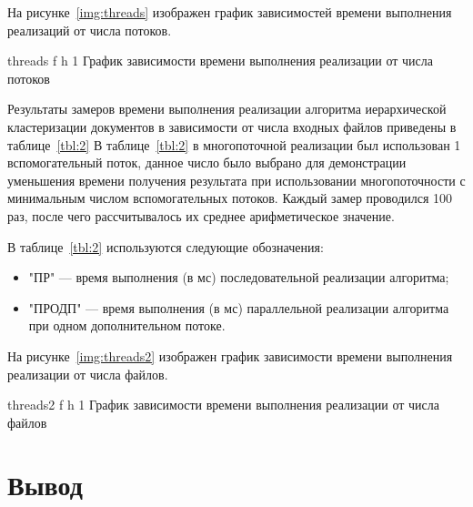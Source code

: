 На рисунке~\ref{img:threads} изображен график зависимостей времени выполнения реализаций от числа потоков.

{threads} %
{f} %
{h} %
{1\textwidth} %
{График зависимости времени выполнения реализации от числа потоков} %

Результаты замеров времени выполнения реализации алгоритма иерархической кластеризации документов в зависимости от числа входных файлов приведены в таблице~\ref{tbl:2} В таблице~\ref{tbl:2} в многопоточной реализации был использован 1 вспомогательный поток, данное число было выбрано для демонстрации уменьшения времени получения результата при использовании многопоточности с минимальным числом вспомогательных потоков. 
Каждый замер проводился 100 раз, после чего рассчитывалось их среднее арифметическое значение.

В таблице~\ref{tbl:2} используются следующие обозначения:

\begin{itemize}
	\item "ПР" --- время выполнения (в мс) последовательной реализации алгоритма;
	\item "ПРОДП" --- время выполнения (в мс) параллельной реализации алгоритма при одном дополнительном потоке.
\end{itemize}



На рисунке~\ref{img:threads2} изображен график зависимости времени выполнения реализации от числа файлов.

{threads2} %
{f} %
{h} %
{1\textwidth} %
{График зависимости времени выполнения реализации от числа файлов} %

\section*{Вывод}

